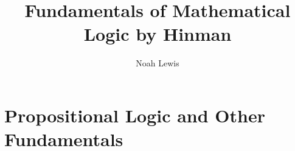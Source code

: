 \documentclass[10pt]{article}  %
\title{Fundamentals of Mathematical Logic by Hinman}
\author{Noah Lewis}
\begin{document}
\maketitle

\tableofcontents

\section{Propositional Logic and Other Fundamentals}

\end{document}
